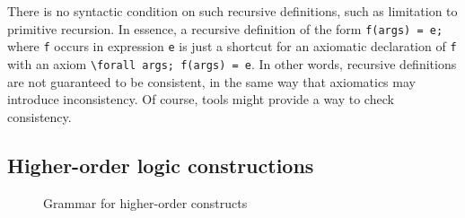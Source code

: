 %  

There is no syntactic condition on such recursive
definitions, such as limitation to primitive recursion. In essence, a
recursive definition of the form \lstinline+f(args) = e;+ where
\lstinline+f+ occurs in expression \lstinline+e+ is just a shortcut
for an axiomatic declaration of \lstinline+f+ with an axiom
\lstinline+\forall args; f(args) = e+.  In other words, recursive
definitions are not guaranteed to be consistent, in the same way that
axiomatics may introduce inconsistency. Of course, tools might provide
a way to check consistency.

\subsection{Higher-order logic constructions}
\label{sec:higherorder}

\experimental

\begin{figure}[t]
  \begin{cadre}
      
    \end{cadre}
  \caption{Grammar for higher-order constructs}
\label{fig:gram:higherorder}
\end{figure}

